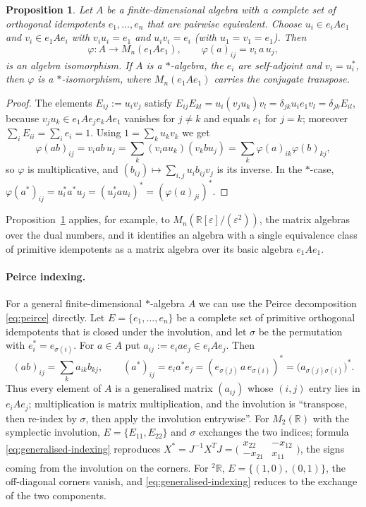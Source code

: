 \documentclass[12pt, a4paper]{report}
\theoremstyle{plain}
\newtheorem{proposition}[theorem]{Proposition}
\theoremstyle{definition}
\theoremstyle{remark}
\theoremstyle{plain}
\newcommand{\RR}{\mathbb{R}}
\newcommand{\twoR}{{}^{2}\mathbb{R}}
\begin{document}
\begin{proposition}\label{prop:matrix-structure}
Let $A$ be a finite-dimensional algebra with a complete set of orthogonal idempotents $e_1,\dots,e_n$ that are pairwise equivalent. Choose $u_i\in e_iAe_1$ and $v_i\in e_1Ae_i$ with $v_iu_i=e_1$ and $u_iv_i=e_i$ (with $u_1=v_1=e_1$). Then
\[
  \varphi: A\to M_n(e_1Ae_1),\qquad \varphi(a)_{ij}=v_i\,a\,u_j,
\]
is an algebra isomorphism. If $A$ is a $*$-algebra, the $e_i$ are self-adjoint and $v_i=u_i^*$, then $\varphi$ is a $*$-isomorphism, where $M_n(e_1Ae_1)$ carries the conjugate transpose.
\end{proposition}
\begin{proof}
The elements $E_{ij}:=u_iv_j$ satisfy $E_{ij}E_{kl}=u_i(v_ju_k)v_l=\delta_{jk}u_ie_1v_l=\delta_{jk}E_{il}$, because $v_ju_k\in e_1Ae_je_kAe_1$ vanishes for $j\neq k$ and equals $e_1$ for $j=k$; moreover $\sum_iE_{ii}=\sum_ie_i=1$. Using $1=\sum_k u_kv_k$ we get
\[
 \varphi(ab)_{ij}=v_iab\,u_j=\sum_k (v_iau_k)(v_kbu_j)=\sum_k\varphi(a)_{ik}\varphi(b)_{kj},
\]
so $\varphi$ is multiplicative, and $(b_{ij})\mapsto\sum_{i,j}u_ib_{ij}v_j$ is its inverse. In the $*$-case, $\varphi(a^*)_{ij}=u_i^*a^*u_j=(u_j^*au_i)^*=(\varphi(a)_{ji})^*$.
\end{proof}

Proposition~\ref{prop:matrix-structure} applies, for example, to $M_n(\RR[\varepsilon]/(\varepsilon^2))$, the matrix algebras over the dual numbers, and it identifies an algebra with a single equivalence class of primitive idempotents as a matrix algebra over its basic algebra $e_1Ae_1$.

\paragraph{Peirce indexing.} For a general finite-dimensional $*$-algebra $A$ we can use the Peirce decomposition \eqref{eq:peirce} directly. Let $E=\{e_1,\dots,e_n\}$ be a complete set of primitive orthogonal idempotents that is closed under the involution, and let $\sigma$ be the permutation with $e_i^*=e_{\sigma(i)}$. For $a\in A$ put $a_{ij}:=e_iae_j\in e_iAe_j$. Then
\begin{equation}\label{eq:generalised-indexing}
  (ab)_{ij}=\sum_{k}a_{ik}b_{kj},\qquad (a^*)_{ij}=e_ia^*e_j=(e_{\sigma(j)}\,a\,e_{\sigma(i)})^*=\bigl(a_{\sigma(j)\sigma(i)}\bigr)^*.
\end{equation}
Thus every element of $A$ is a generalised matrix $(a_{ij})$ whose $(i,j)$ entry lies in $e_iAe_j$; multiplication is matrix multiplication, and the involution is ``transpose, then re-index by $\sigma$, then apply the involution entrywise''. For $M_2(\RR)$ with the symplectic involution, $E=\{E_{11},E_{22}\}$ and $\sigma$ exchanges the two indices; formula \eqref{eq:generalised-indexing} reproduces $X^*=J^{-1}X^TJ=\bigl(\begin{smallmatrix}x_{22}&-x_{12}\\-x_{21}&x_{11}\end{smallmatrix}\bigr)$, the signs coming from the involution on the corners. For $\twoR$, $E=\{(1,0),(0,1)\}$, the off-diagonal corners vanish, and \eqref{eq:generalised-indexing} reduces to the exchange of the two components.
\end{document}
